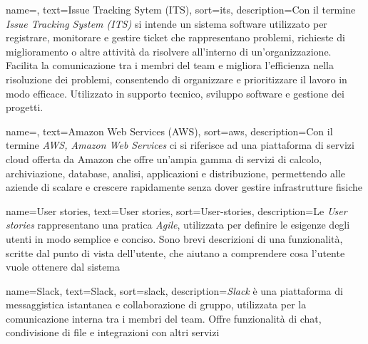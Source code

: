 




 {
    name=,
    text=Issue Tracking Sytem (ITS),
    sort=its,
    description={Con il termine \emph{Issue Tracking System (ITS) } si intende un sistema software utilizzato per registrare, monitorare e gestire ticket che rappresentano problemi, richieste di miglioramento o altre attività da risolvere all’interno di un’organizzazione. Facilita la comunicazione tra i membri del team e migliora l’efficienza nella risoluzione dei problemi, consentendo di organizzare e prioritizzare il lavoro in modo efficace. Utilizzato in supporto tecnico, sviluppo software e gestione dei progetti.}
}

 {
    name=,
    text=Amazon Web Services (AWS),
    sort=aws,
    description={Con il termine \emph{AWS, Amazon Web Services} ci si riferisce ad una piattaforma di servizi cloud offerta da Amazon che offre un’ampia gamma di servizi di calcolo, archiviazione, database, analisi, applicazioni e distribuzione, permettendo alle aziende di scalare e crescere rapidamente senza dover gestire infrastrutture fisiche}
}

 {
    name=User stories,
    text=User stories,
    sort=User-stories,
    description={Le \emph{User stories} rappresentano una pratica \textit{Agile}, utilizzata per definire le esigenze degli utenti in modo semplice e conciso. Sono brevi descrizioni di una funzionalità, scritte dal punto di vista dell'utente, che aiutano a comprendere cosa l'utente vuole ottenere dal sistema}
}

 {
    name=Slack,
    text=Slack,
    sort=slack,
    description={\emph{Slack} è una piattaforma di messaggistica istantanea e collaborazione di gruppo, utilizzata per la comunicazione interna tra i membri del team. Offre funzionalità di chat, condivisione di file e integrazioni con altri servizi}
}
